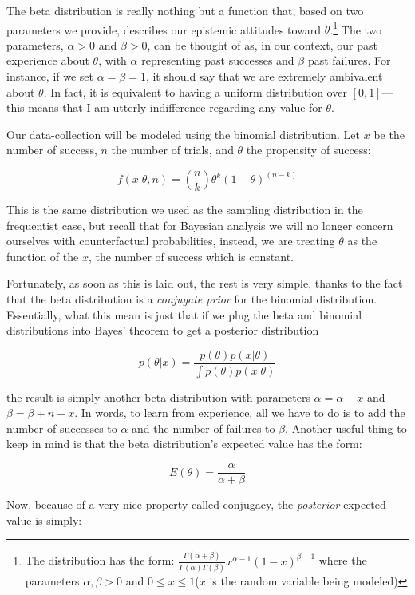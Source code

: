 The beta distribution is really nothing but a function that, based on
two parameters we provide, describes our epistemic attitudes toward
\(\theta\).\footnote{The distribution has the form:
  \(\frac{\Gamma(\alpha + \beta)}{\Gamma(\alpha)\Gamma(\beta)}x^{\alpha -1} (1-x)^{\beta -1}\)
  where the parameters \(\alpha,\beta > 0\) and
  \(0\leq x \leq 1\)(\(x\) is the random variable being
  modeled) } The two parameters, \(\alpha>0\) and \(\beta>0\), can be
thought of as, in our context, our past experience about \(\theta\),
with \(\alpha\) representing past successes and \(\beta\) past failures.
For instance, if we set \(\alpha = \beta = 1\), it should say that we
are extremely ambivalent about \(\theta\). In fact, it is equivalent to
having a uniform distribution over \([0,1]\)---this means that I am
utterly indifference regarding any value for \(\theta\).

Our data-collection will be modeled using the binomial distribution. Let
\(x\) be the number of success, \(n\) the number of trials, and
\(\theta\) the propensity of success:

\[f(x|\theta, n) = {n\choose k} \theta^k (1-\theta)^{(n-k)}\]

This is the same distribution we used as the sampling distribution in
the frequentist case, but recall that for Bayesian analysis we will no
longer concern ourselves with counterfactual probabilities, instead, we
are treating \(\theta\) as the function of the \(x\), the number of
success which is constant.

Fortunately, as soon as this is laid out, the rest is very simple,
thanks to the fact that the beta distribution is a \emph{conjugate
prior} for the binomial distribution. Essentially, what this mean is
just that if we plug the beta and binomial distributions into Bayes'
theorem to get a posterior distribution

\[ p(\theta|x) = \frac{p(\theta)p(x|\theta)}{\int p(\theta)p(x|\theta)}\]

\noindent the result is simply another beta distribution with parameters
\(\alpha =\alpha + x\) and \(\beta = \beta + n - x\). In words, to learn
from experience, all we have to do is to add the number of successes to
\(\alpha\) and the number of failures to \(\beta\). Another useful thing
to keep in mind is that the beta distribution's expected value has the
form:

\[E(\theta) = \frac{\alpha}{\alpha + \beta}\]

\noindent Now, because of a very nice property called conjugacy, the \emph{posterior} expected value
is simply:

